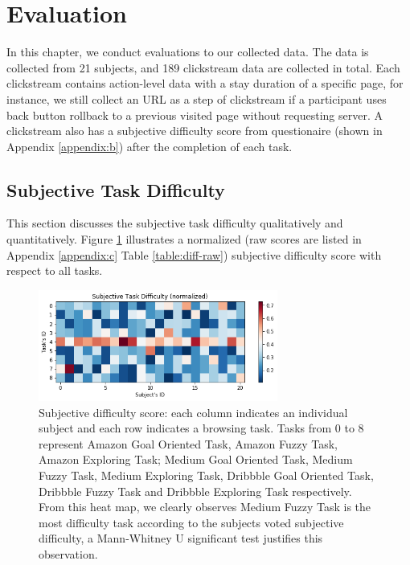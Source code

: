 \section{Evaluation}
\label{ch:eval}

In this chapter, we conduct evaluations to our collected data.
The data is collected from 21 subjects, and 189 clickstream data are collected in total. 
Each clickstream contains action-level data with a stay duration
of a specific page, for instance, we still collect an URL as a step of clickstream 
if a participant uses back button rollback to a previous visited page without requesting server. 
A clickstream also has a subjective difficulty score from questionaire (shown in Appendix \ref{appendix:b}) 
after the completion of each task.

\subsection{Subjective Task Difficulty}
\label{sec:task-diff}

This section discusses the subjective task difficulty qualitatively and quantitatively.
Figure \ref{fig:difficulty} illustrates a normalized (raw scores are listed in 
Appendix \ref{appendix:c} Table \ref{table:diff-raw}) subjective difficulty score 
with respect to all tasks.

\begin{figure}[H]
    \centering
    \includegraphics[width=0.7\textwidth]{figures/difficulty}
    \caption{Subjective difficulty score: each column indicates an individual subject and
    each row indicates a browsing task. Tasks from 0 to 8 represent Amazon Goal Oriented Task,
    Amazon Fuzzy Task, Amazon Exploring Task; Medium Goal Oriented Task, Medium Fuzzy Task,
    Medium Exploring Task, Dribbble Goal Oriented Task, Dribbble Fuzzy Task and Dribbble Exploring Task
    respectively.
    From this heat map, we clearly observes Medium Fuzzy Task is the most difficulty task
    according to the subjects voted subjective difficulty, a Mann-Whitney U significant 
    test justifies this observation.}
    \label{fig:difficulty}
\end{figure}

